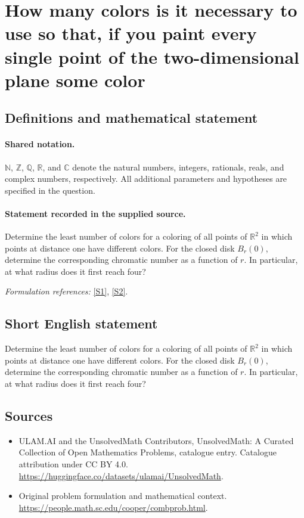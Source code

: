 \documentclass[11pt]{article}
\newcommand{\sref}[2]{\hyperlink{source:#1:#2}{[S#2]}}
\begin{document}
\section{How many colors is it necessary to use so that, if you paint every single point of the two-dimensional plane some color}\label{statement}

\subsection{Definitions and mathematical statement}

\paragraph{Shared notation.}$\mathbb N$, $\mathbb Z$, $\mathbb Q$, $\mathbb R$, and $\mathbb C$ denote the natural numbers, integers, rationals, reals, and complex numbers, respectively. All additional parameters and hypotheses are specified in the question.


\paragraph{Statement recorded in the supplied source.}
Determine the least number of colors for a coloring of all points of $\mathbb R^2$ in which points at distance one have different colors. For the closed disk $B_r(0)$, determine the corresponding chromatic number as a function of $r$. In particular, at what radius does it first reach four?
\par\smallskip\textit{Formulation references:} \sref{statement}{1}, \sref{statement}{2}.
\subsection{Short English statement}
Determine the least number of colors for a coloring of all points of $\mathbb R^2$ in which points at distance one have different colors. For the closed disk $B_r(0)$, determine the corresponding chromatic number as a function of $r$. In particular, at what radius does it first reach four?
\subsection{Sources}
\begin{itemize}
\item[\hypertarget{source:statement:1}{S1}] ULAM.AI and the UnsolvedMath Contributors, UnsolvedMath: A Curated Collection of Open Mathematics Problems, catalogue entry. Catalogue attribution under CC BY 4.0.
\url{https://huggingface.co/datasets/ulamai/UnsolvedMath}.
\item[\hypertarget{source:statement:2}{S2}] Original problem formulation and mathematical context.
\url{https://people.math.sc.edu/cooper/combprob.html}.
\end{itemize}
\label{end:statement}
\end{document}
